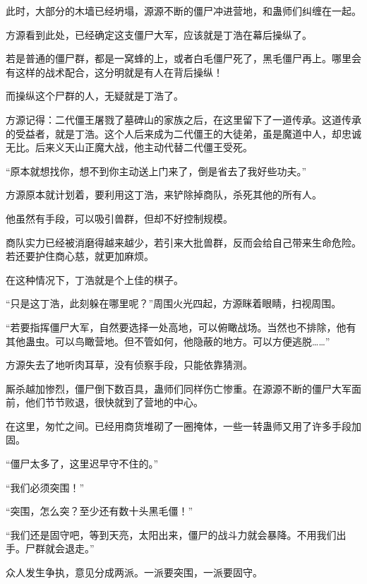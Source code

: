 
\begin{this_body}



此时，大部分的木墙已经坍塌，源源不断的僵尸冲进营地，和蛊师们纠缠在一起。

方源看到此处，已经确定这支僵尸大军，应该就是丁浩在幕后操纵了。

若是普通的僵尸群，都是一窝蜂的上，或者白毛僵尸死了，黑毛僵尸再上。哪里会有这样的战术配合，这分明就是有人在背后操纵！

而操纵这个尸群的人，无疑就是丁浩了。

方源记得：二代僵王屠戮了墓碑山的家族之后，在这里留下了一道传承。这道传承的受益者，就是丁浩。这个人后来成为二代僵王的大徒弟，虽是魔道中人，却忠诚无比。后来义天山正魔大战，他主动代替二代僵王受死。

“原本就想找你，想不到你主动送上门来了，倒是省去了我好些功夫。”

方源原本就计划着，要利用这丁浩，来铲除掉商队，杀死其他的所有人。

他虽然有手段，可以吸引兽群，但却不好控制规模。

商队实力已经被消磨得越来越少，若引来大批兽群，反而会给自己带来生命危险。若还要护住商心慈，就更加麻烦。

在这种情况下，丁浩就是个上佳的棋子。

“只是这丁浩，此刻躲在哪里呢？”周围火光四起，方源眯着眼睛，扫视周围。

“若要指挥僵尸大军，自然要选择一处高地，可以俯瞰战场。当然也不排除，他有其他蛊虫。可以鸟瞰营地。但不管如何，他隐蔽的地方。可以方便逃脱……”

方源失去了地听肉耳草，没有侦察手段，只能依靠猜测。

厮杀越加惨烈，僵尸倒下数百具，蛊师们同样伤亡惨重。在源源不断的僵尸大军面前，他们节节败退，很快就到了营地的中心。

在这里，匆忙之间。已经用商货堆砌了一圈掩体，一些一转蛊师又用了许多手段加固。

“僵尸太多了，这里迟早守不住的。”

“我们必须突围！”

“突围，怎么突？至少还有数十头黑毛僵！”

“我们还是固守吧，等到天亮，太阳出来，僵尸的战斗力就会暴降。不用我们出手。尸群就会退走。”

众人发生争执，意见分成两派。一派要突围，一派要固守。


\end{this_body}
